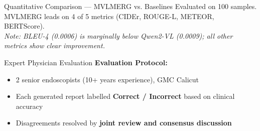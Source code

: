 ﻿\documentclass[aspectratio=169]{beamer}
\newcommand{\scite}[1]{{\footnotesize\color{darkgray}\citet{#1}}}
\begin{document}
\begin{frame}{Quantitative Comparison --- MVLMERG vs. Baselines}
\centering
{}
\vspace{0.4em}
\small Evaluated on 100 samples. MVLMERG leads on 4 of 5 metrics (CIDEr, ROUGE-L, METEOR, BERTScore). \\
\footnotesize\textit{Note: BLEU-4 (0.0006) is marginally below Qwen2-VL (0.0009); all other metrics show clear improvement.}
\end{frame}

\begin{frame}{Expert Physician Evaluation}
\vspace{0.3em}
\textbf{Evaluation Protocol:} \scite{pmc2024endo}
\begin{itemize}
    \item 2 senior endoscopists (10+ years experience), GMC Calicut
    \item Each generated report labelled \textbf{Correct / Incorrect} based on clinical accuracy
    \item Disagreements resolved by \textbf{joint review and consensus discussion}
\end{itemize}
\vspace{0.3em}

\end{frame}
\end{document}
